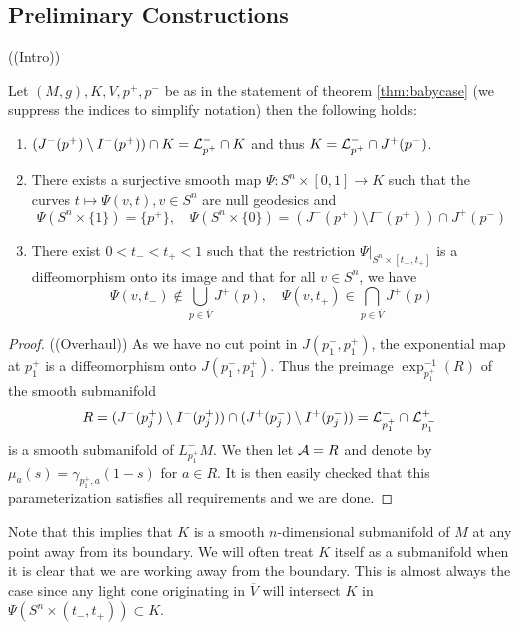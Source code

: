 \subsection{Preliminary Constructions}
((Intro))
\begin{lemma}\label{lem:Kcharact}
Let $(M,g), K, V, p^+,p^-$ be as in the statement of theorem \ref{thm:babycase} (we suppress the indices to simplify notation) then the following holds:
\begin{enumerate}[label={\textnormal{(\arabic*)}}]
\item $(J^-(p^+)\setminus I^-(p^+)) \cap K = \mathcal{L}^-_{p^+} \cap K$ and thus $K = \mathcal{L}^-_{p^+} \cap J^+(p^-)$.
\item There exists a surjective smooth map $\Psi:S^n\times[0,1] \to K$ such that the curves $t\mapsto\Psi(v,t), v\in S^n$ are null geodesics and \[\Psi(S^n\times\{1\}) = \{p^+\}, \quad \Psi(S^n\times\{0\}) = (J^-(p^+)\setminus I^-(p^+)) \cap J^+(p^-)\]
\item There exist $0<t_-<t_+<1$ such that the restriction $\Psi\rvert_{S^n\times[t_-,t_+]}$ is a diffeomorphism onto its image and that for all $v \in S^n$, we have 
\[
\Psi(v,t_-) \notin \bigcup_{p\in \overline{V}} J^+(p), \quad \Psi(v,t_+) \in \bigcap_{p\in \overline{V}} J^+(p)
\]
\end{enumerate}
\end{lemma}
\begin{proof}
((Overhaul))
As we have no cut point in $J(p_1^-,p_1^+)$, the exponential map at $p_1^+$ is a diffeomorphism onto $J(p_1^-,p_1^+)$. Thus the preimage $\exp^{-1}_{p_1^+}(R)$ of the smooth submanifold
\[
    R = (J^-(p_j^+)\setminus I^-(p_j^+)) \cap (J^+(p_j^-)\setminus I^+(p_j^-)) = \mathcal{L}^-_{p_1^+} \cap \mathcal{L}^+_{p_1^-}
\]
is a smooth submanifold of $L^-_{p^+_1}M$. We then let $\mathcal{A}=R$ and denote by $\mu_a(s) = \gamma_{p_1^+,a}(1-s)$ for $a\in R$. It is then easily checked that this parameterization satisfies all requirements and we are done.
\end{proof}

Note that this implies that $K$ is a smooth $n$-dimensional submanifold of $M$ at any point away from its boundary. We will often treat $K$ itself as a submanifold when it is clear that we are working away from the boundary. This is almost always the case since any light cone originating in $\overline{V}$ will intersect $K$ in $\Psi(S^n\times(t_-,t_+))\subset K$.

